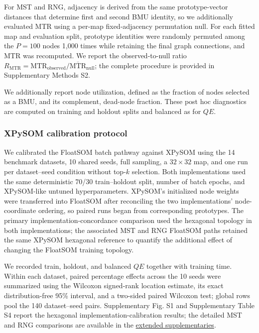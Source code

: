 \documentclass[10pt]{article} %
\begin{document}
For MST and RNG, adjacency is derived from the same prototype-vector distances that determine first and second BMU identity, so we additionally evaluated MTR using a per-map fixed-adjacency permutation null. For each fitted map and evaluation split, prototype identities were randomly permuted among the $P=100$ nodes 1,000 times while retaining the final graph connections, and MTR was recomputed. We report the observed-to-null ratio $R_{\mathrm{MTR}}=\mathrm{MTR}_{\mathrm{observed}}/\overline{\mathrm{MTR}}_{\mathrm{null}}$; the complete procedure is provided in Supplementary Methods S2.

We additionally report node utilization, defined as the fraction of nodes selected as a BMU, and its complement, dead-node fraction. These post hoc diagnostics are computed on training and holdout splits and balanced as for $QE$.

\subsubsection{XPySOM calibration protocol}

We calibrated the FloatSOM batch pathway against XPySOM using the 14 benchmark datasets, 10 shared seeds, full sampling, a $32\times32$ map, and one run per dataset--seed condition without top-$k$ selection. Both implementations used the same deterministic 70/30 train--holdout split, number of batch epochs, and XPySOM-like untuned hyperparameters. XPySOM's initialized node weights were transferred into FloatSOM after reconciling the two implementations' node-coordinate ordering, so paired runs began from corresponding prototypes. The primary implementation-concordance comparison used the hexagonal topology in both implementations; the associated MST and RNG FloatSOM paths retained the same XPySOM hexagonal reference to quantify the additional effect of changing the FloatSOM training topology.

We recorded train, holdout, and balanced $QE$ together with training time. Within each dataset, paired percentage effects across the 10 seeds were summarized using the Wilcoxon signed-rank location estimate, its exact distribution-free 95\% interval, and a two-sided paired Wilcoxon test; global rows pool the 140 dataset--seed pairs. Supplementary Fig. S1 and Supplementary Table S4 report the hexagonal implementation-calibration results; the detailed MST and RNG comparisons are available in the \href{https://github.com/1ordinateur/floatsom-publication/blob/main/extended_supplementaries.zip}{extended supplementaries}.
\end{document}
